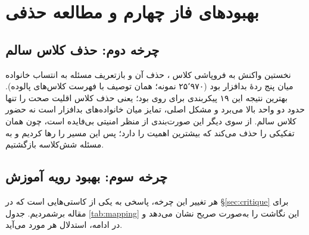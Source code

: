 \section{بهبود‌های فاز چهارم و مطالعه حذفی}
\label{sec:phase4}

\subsection{چرخه دوم: حذف کلاس سالم}
نخستین واکنش به فروپاشی کلاس ، حذف آن و بازتعریف مسئله به انتساب خانواده میان پنج ردهٔ بدافزار بود (\num{۲۵٬۹۷۰} نمونه؛ همان توصیف  با فهرست کلاس‌های پالوده). بهترین نتیجه این ۱۹ پیکربندی  برای  روی  بود؛ یعنی حذف کلاس اقلیت صحت را تنها حدود دو واحد بالا می‌برد و مشکل اصلی، تمایز میان خانواده‌های بدافزار است نه حضور کلاس سالم. از سوی دیگر این صورت‌بندی از منظر امنیتی بی‌فایده است، چون همان تفکیکی را حذف می‌کند که بیشترین اهمیت را دارد؛ پس این مسیر را رها کردیم و به مسئله شش‌کلاسه بازگشتیم.

\subsection{چرخه سوم: بهبود رویه آموزش}
هر تغییر این چرخه، پاسخی به یکی از کاستی‌هایی است که در \S\ref{sec:critique} برای مقاله برشمردیم. جدول \ref{tab:mapping} این نگاشت را به‌صورت صریح نشان می‌دهد و در ادامه، استدلال هر مورد می‌آید.

